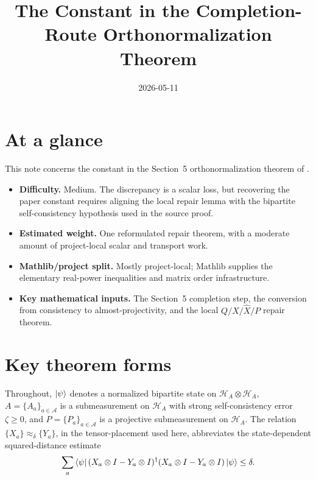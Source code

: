 \documentclass{article}
\title{The Constant in the Completion-Route Orthonormalization Theorem}
\author{}
\date{2026-05-11}
\begin{document}
\maketitle

\section{At a glance}

This note concerns the constant in the Section~5 orthonormalization theorem of
\cite{Ji2020LowIndividualDegree}.

\begin{itemize}
  \item \textbf{Difficulty.} Medium.  The discrepancy is a scalar loss, but
  recovering the paper constant requires aligning the local repair lemma with
  the bipartite self-consistency hypothesis used in the source proof.
  \item \textbf{Estimated weight.} One reformulated repair theorem, with a
  moderate amount of project-local scalar and transport work.
  \item \textbf{Mathlib/project split.} Mostly project-local; Mathlib supplies
  the elementary real-power inequalities and matrix order infrastructure.
  \item \textbf{Key mathematical inputs.} The Section~5 completion step, the conversion from
  consistency to almost-projectivity, and the local \(Q/X/\widehat X/P\) repair
  theorem.
\end{itemize}

\section{Key theorem forms}

Throughout, \(\ket{\psi}\) denotes a normalized bipartite state on
\(\mathcal H_A\otimes\mathcal H_A\), \(A=\{A_a\}_{a\in\mathcal A}\)
is a submeasurement on \(\mathcal H_A\) with strong self-consistency error
\(\zeta\ge 0\), and \(P=\{P_a\}_{a\in\mathcal A}\) is a projective
submeasurement on \(\mathcal H_A\).  The relation
\(\{X_a\}\approx_\delta\{Y_a\}\), in the tensor-placement used here, abbreviates
the state-dependent squared-distance estimate
\[
  \sum_a
  \bra{\psi}
    (X_a\otimes I-Y_a\otimes I)^\dagger
    (X_a\otimes I-Y_a\otimes I)
  \ket{\psi}
  \le \delta.
\]
\end{document}
